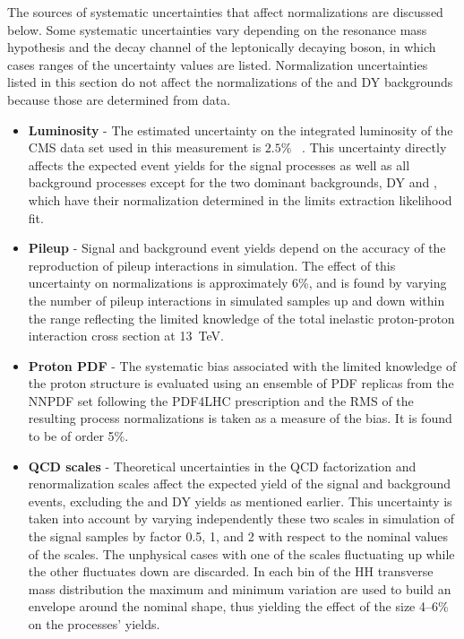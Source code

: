 The sources of systematic
uncertainties that affect normalizations are discussed below. Some
systematic uncertainties vary depending on the resonance mass hypothesis
and the decay channel of the leptonically decaying \PZ boson, in which cases
ranges of the uncertainty values are listed. Normalization uncertainties
listed in this section do not affect the normalizations of the \ttbar and DY
backgrounds because those are determined from data.

\begin{itemize}

\item{\bf Luminosity} - The estimated uncertainty on the integrated
  luminosity of the CMS data set used in this measurement is $2.5\%$
  ~\cite{CMS-PAS-LUM-17-001}. This uncertainty directly affects the
  expected event yields for the signal processes as well as all
  background processes except for the two dominant backgrounds, DY and
  \ttbar, which have their normalization determined in the
  limits extraction likelihood fit.

\item{\bf Pileup} - Signal and background event yields depend on the
  accuracy of the reproduction of pileup interactions in
  simulation. The effect of this uncertainty on normalizations is
  approximately 6\%, and is found by varying the number of pileup
  interactions in simulated samples up and down within the range
  reflecting the limited knowledge of the total inelastic
  proton-proton interaction cross section at 13~TeV.

\item{\bf Proton PDF} - The systematic bias associated with the limited
  knowledge of the proton structure is evaluated using an ensemble of PDF
  replicas from the NNPDF set \cite{Ball:2014uwa} following the
  PDF4LHC prescription \cite{Botje:2011sn,Alekhin:2011sk} and the RMS
  of the resulting process normalizations is taken as a measure of the
  bias. It is found to be of order 5\%.

\item{\bf QCD scales} - Theoretical uncertainties in the QCD
  factorization and renormalization scales affect the expected yield
  of the signal and background events, excluding the \ttbar and DY
  yields as mentioned earlier. This uncertainty is taken into account
  by varying independently these two scales in simulation of the
  signal samples by factor 0.5, 1, and 2 with respect to the nominal
  values of the scales. The unphysical cases with one of the scales
  fluctuating up while the other fluctuates down are discarded.  In
  each bin of the HH transverse mass distribution the maximum and
  minimum variation are used to build an envelope around the nominal
  shape, thus yielding the effect of the size 4--6\% on the processes'
  yields.


\end{itemize}
